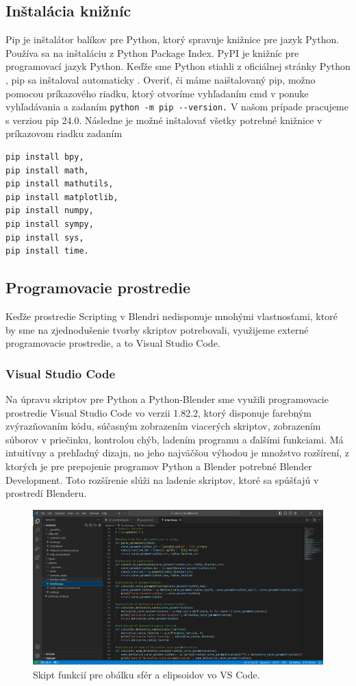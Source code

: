 \subsection{Inštalácia knižníc}
Pip je inštalátor balíkov pre Python, ktorý spravuje knižnice pre jazyk Python. Používa sa na inštaláciu z Python Package Index. PyPI je knižníc pre programovací jazyk Python. Keďže sme Python stiahli z oficiálnej stránky Python \cite{PythonDownload}, pip sa inštaloval automaticky \cite{Pip}. Overiť, či máme naištalovaný pip, možno pomocou príkazového riadku, ktorý otvoríme vyhľadaním cmd v ponuke vyhľadávania a zadaním
\verb|python -m pip --version.|
V našom prípade pracujeme s verziou pip 24.0. Následne je možné inštalovať všetky potrebné knižnice v príkazovom riadku zadaním
\begin{verbatim}
pip install bpy,
pip install math,
pip install mathutils,
pip install matplotlib,
pip install numpy,
pip install sympy,
pip install sys,
pip install time.
\end{verbatim}
\subsection{Programovacie prostredie}
Keďže prostredie Scripting v Blendri nedisponuje mnohými vlastnosťami, ktoré by sme na zjednodušenie tvorby skriptov potrebovali, využijeme externé programovacie prostredie, a to Visual Studio Code. 
\subsubsection{Visual Studio Code}
Na úpravu skriptov pre Python a Python-Blender sme využili programovacie prostredie Visual Studio Code vo verzii 1.82.2, ktorý disponuje farebným zvýrazňovaním kódu, súčasným zobrazením viacerých skriptov, zobrazením súborov v priečinku, kontrolou chýb, ladením programu a ďalšími funkciami. Má intuitívny a prehľadný dizajn, no jeho najväčšou výhodou je množstvo rozšírení, z ktorých je pre prepojenie programov Python a Blender potrebné Blender Development. Toto rozšírenie slúži na ladenie skriptov, ktoré sa spúšťajú v prostredí Blenderu.

\begin{figure}[h!]
	\centering
	\includegraphics[width=\textwidth]{images/vscode.png}
	\caption[Softvér Visual Studio Code.]{Skipt funkcií pre obálku sfér a elipsoidov vo VS Code.}
	\label{fig:vscode}
\end{figure}

